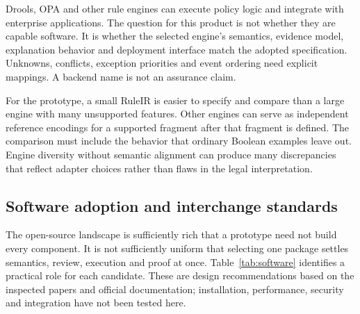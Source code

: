 \documentclass[12pt,a4paper,oneside,openany]{book}
\begin{document}
Drools, OPA and other rule engines can execute policy logic and integrate with
enterprise applications. The question for this product is not whether they
are capable software. It is whether the selected engine's semantics, evidence
model, explanation behavior and deployment interface match the adopted
specification. Unknowns, conflicts, exception priorities and event ordering
need explicit mappings. A backend name is not an assurance claim.

For the prototype, a small RuleIR is easier to specify and compare than a
large engine with many unsupported features. Other engines can serve as
independent reference encodings for a supported fragment after that fragment
is defined. The comparison must include the behavior that ordinary Boolean
examples leave out. Engine diversity without semantic alignment can produce
many discrepancies that reflect adapter choices rather than flaws in the
legal interpretation.

\subsection{Software adoption and interchange standards}
\label{merge:P-02-literature:08}


The open-source landscape is sufficiently rich that a prototype need not build
every component. It is not sufficiently uniform that selecting one package
settles semantics, review, execution and proof at once. Table~\ref{tab:software}
identifies a practical role for each candidate. These are design recommendations
based on the inspected papers and official documentation; installation,
performance, security and integration have not been tested here.
\end{document}
